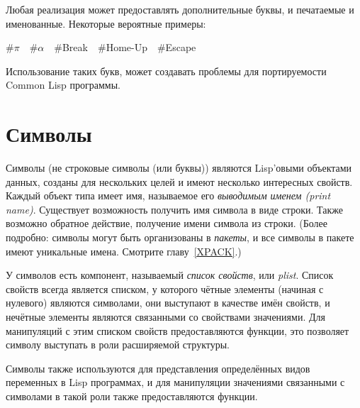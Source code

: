 Любая реализация может предоставлять дополнительные буквы, и
печатаемые и именованные. Некоторые вероятные примеры:

\begin{lisp}
\#{\Xbackslash}$\pi$~~\#{\Xbackslash}$\alpha$~~\#{\Xbackslash}Break~~\#{\Xbackslash}Home-Up~~\#{\Xbackslash}Escape
\end{lisp}

Использование таких букв, может создавать проблемы для портируемости Common
Lisp программы.

\section{Символы}

Символы (не строковые символы (или буквы)) являются Lisp'овыми
объектами данных, созданы для нескольких целей и имеют несколько
интересных свойств. Каждый объект типа  имеет имя,
называемое его \emph{выводимым именем (print name)}. Существует
возможность получить имя символа в виде строки. Также возможно
обратное действие, получение имени символа из строки. (Более подробно:
символы могут быть организованы в \emph{пакеты}, и все символы в
пакете имеют уникальные имена. Смотрите главу~\ref{XPACK}.)

У символов есть компонент, называемый \emph{список свойств}, или \emph{plist}.
Список свойств всегда является списком, у которого чётные элементы (начиная с
нулевого) являются символами, они выступают в качестве имён свойств, и нечётные
элементы являются связанными со свойствами значениями. Для манипуляций с этим
списком свойств предоставляются функции, это позволяет символу выступать в роли
расширяемой структуры.

Символы также используются для представления определённых видов переменных в
Lisp программах, и для манипуляции значениями связанными с символами в такой
роли также предоставляются функции.

